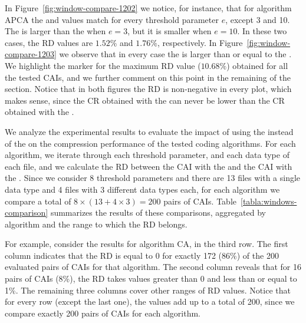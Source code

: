 In Figure~\ref{fig:window-compare-1202} we notice, for instance, that for algorithm APCA the \ows and \lows values match for every threshold parameter $e$, except 3 and 10. The \ows is larger than the \lows when $e=3$, but it is smaller when $e=10$. In these two cases, the RD values are $1.52\%$ and $1.76\%$, respectively. In Figure~\ref{fig:window-compare-1203} we observe that in every case the \ows is larger than or equal to the \lows. We highlight the marker for the maximum RD value ($10.68\%$) obtained for all the tested CAIs, and we further comment on this point in the remaining of the section. Notice that in both figures the RD is non-negative in every plot, which makes sense, since the CR obtained with the \ows can never be lower than the CR obtained with the \lows.

\clearpage


\clearpage


We analyze the experimental results to evaluate the impact of using the \ows instead of the \lows on the compression performance of the tested coding algorithms. For each algorithm, we iterate through each threshold parameter, and each data type of each file, and we calculate the RD between the CAI with the \ows and the CAI with the \lows. Since we consider 8 threshold parameters and there are 13 files with a single data type and 4 files with 3 different data types each, for each algorithm we compare a total of $8 \times (13 + 4\times3) = 200$ pairs of CAIs. Table~\ref{tabla:windows-comparison} summarizes the results of these comparisons, aggregated by algorithm and the range to which the RD belongs. 


\vspace{+5pt}

\vspace{-5pt}


For example, consider the results for algorithm CA, in the third row. The first column indicates that the RD is equal to 0 for exactly 172 (86\%) of the 200 evaluated pairs of CAIs for that algorithm. The second column reveals that for 16 pairs of CAIs (8\%), the RD takes values greater than 0 and less than or equal to 1\%. The remaining three columns cover other ranges of RD values. Notice that for every row (except the last one), the values add up to a total of 200, since we compare exactly 200 pairs of CAIs for each algorithm.


